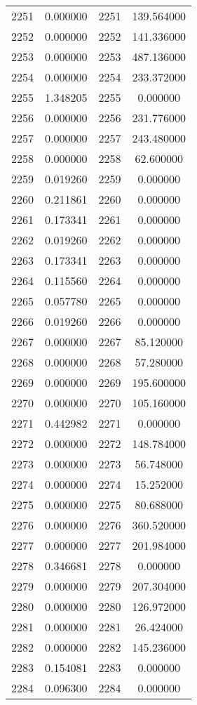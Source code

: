 \documentclass[12pt]{article}
\begin{document}
\begin{longtable}{@{}cccc@{}}
2251 & 0.000000 & 2251 & 139.564000 \\
2252 & 0.000000 & 2252 & 141.336000 \\
2253 & 0.000000 & 2253 & 487.136000 \\
2254 & 0.000000 & 2254 & 233.372000 \\
2255 & 1.348205 & 2255 & 0.000000 \\
2256 & 0.000000 & 2256 & 231.776000 \\
2257 & 0.000000 & 2257 & 243.480000 \\
2258 & 0.000000 & 2258 & 62.600000 \\
2259 & 0.019260 & 2259 & 0.000000 \\
2260 & 0.211861 & 2260 & 0.000000 \\
2261 & 0.173341 & 2261 & 0.000000 \\
2262 & 0.019260 & 2262 & 0.000000 \\
2263 & 0.173341 & 2263 & 0.000000 \\
2264 & 0.115560 & 2264 & 0.000000 \\
2265 & 0.057780 & 2265 & 0.000000 \\
2266 & 0.019260 & 2266 & 0.000000 \\
2267 & 0.000000 & 2267 & 85.120000 \\
2268 & 0.000000 & 2268 & 57.280000 \\
2269 & 0.000000 & 2269 & 195.600000 \\
2270 & 0.000000 & 2270 & 105.160000 \\
2271 & 0.442982 & 2271 & 0.000000 \\
2272 & 0.000000 & 2272 & 148.784000 \\
2273 & 0.000000 & 2273 & 56.748000 \\
2274 & 0.000000 & 2274 & 15.252000 \\
2275 & 0.000000 & 2275 & 80.688000 \\
2276 & 0.000000 & 2276 & 360.520000 \\
2277 & 0.000000 & 2277 & 201.984000 \\
2278 & 0.346681 & 2278 & 0.000000 \\
2279 & 0.000000 & 2279 & 207.304000 \\
2280 & 0.000000 & 2280 & 126.972000 \\
2281 & 0.000000 & 2281 & 26.424000 \\
2282 & 0.000000 & 2282 & 145.236000 \\
2283 & 0.154081 & 2283 & 0.000000 \\
2284 & 0.096300 & 2284 & 0.000000 \\

\end{longtable}
\end{document}
